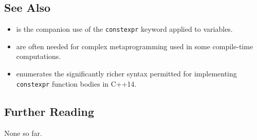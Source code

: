 \subsection[See Also]{See Also}\label{see-also}

\begin{itemize}
\item{ is the companion use of the \lstinline!constexpr! keyword applied to variables.}
\item{ are often needed for complex metaprogramming used in some compile-time computations.}
\item{ enumerates the significantly richer syntax permitted for implementing \lstinline!constexpr! function bodies in C++14.}
\end{itemize}

\subsection[Further Reading]{Further Reading}\label{further-reading}

None so far.


